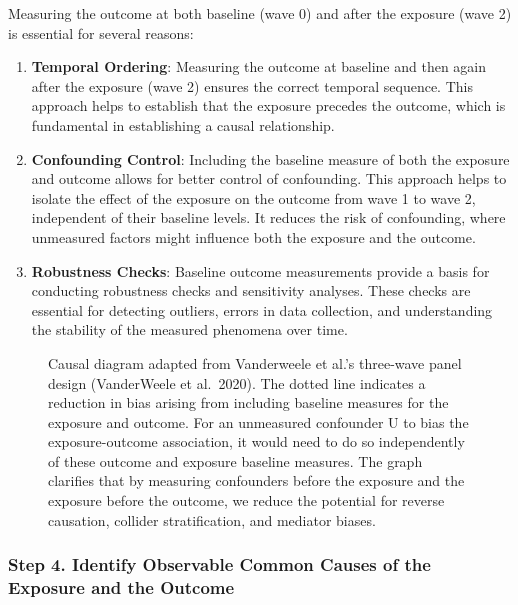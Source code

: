 \documentclass[
  singlecolumn,
  9pt]{article}
\begin{document}
Measuring the outcome at both baseline (wave 0) and after the exposure
(wave 2) is essential for several reasons:

\begin{enumerate}
\def\labelenumi{\arabic{enumi}.}
\item
  \textbf{Temporal Ordering}: Measuring the outcome at baseline and then
  again after the exposure (wave 2) ensures the correct temporal
  sequence. This approach helps to establish that the exposure precedes
  the outcome, which is fundamental in establishing a causal
  relationship.
\item
  \textbf{Confounding Control}: Including the baseline measure of both
  the exposure and outcome allows for better control of confounding.
  This approach helps to isolate the effect of the exposure on the
  outcome from wave 1 to wave 2, independent of their baseline levels.
  It reduces the risk of confounding, where unmeasured factors might
  influence both the exposure and the outcome.
\item
  \textbf{Robustness Checks}: Baseline outcome measurements provide a
  basis for conducting robustness checks and sensitivity analyses. These
  checks are essential for detecting outliers, errors in data
  collection, and understanding the stability of the measured phenomena
  over time.
\end{enumerate}

\begin{figure}


\caption{\label{fig-dag-1}Causal diagram adapted from Vanderweele et
al.'s three-wave panel design (VanderWeele et al.~2020). The dotted line
indicates a reduction in bias arising from including baseline measures
for the exposure and outcome. For an unmeasured confounder U to bias the
exposure-outcome association, it would need to do so independently of
these outcome and exposure baseline measures. The graph clarifies that
by measuring confounders before the exposure and the exposure before the
outcome, we reduce the potential for reverse causation, collider
stratification, and mediator biases.}

\end{figure}%

\subsubsection{Step 4. Identify Observable Common Causes of the Exposure
and the
Outcome}\label{step-4.-identify-observable-common-causes-of-the-exposure-and-the-outcome}
\end{document}
